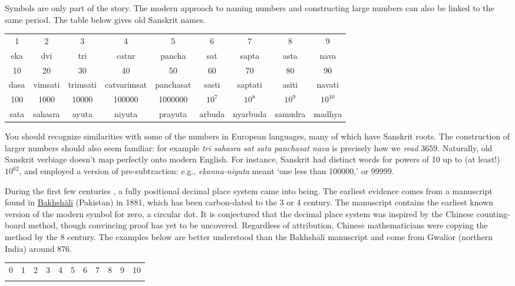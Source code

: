 Symbols are only part of the story. The modern approach to naming numbers and constructing large numbers can also be linked to the same period. The table below gives old Sanskrit names.
\begin{center}
	\begin{tabular}{ccccccccc}
		1&2&3&4&5&6&7&8&9\\
		eka&dvi&tri&catur&pancha&sat&sapta&asta&nava\\[0.3cm]
		10&20&30&40&50&60&70&80&90\\
		dasa&vimsati&trimsati&catvarimsat&panchasat&sasti&saptati&asiti&navati\\[0.3cm]
		100&1000&10000&100000&1000000&$10^7$&$10^8$&$10^9$&$10^{10}$\\
		sata&sahasra&ayuta&niyuta&prayuta&arbuda&nyarbuda&samudra&madhya
	\end{tabular}
\end{center}
You should recognize similarities with some of the numbers in European languages, many of which have Sanskrit roots. The construction of larger numbers should also seem familiar: for example \emph{tri sahasra sat sata panchasat nava} is precisely how we \emph{read} 3659.
\smallbreak
Naturally, old Sanskrit verbiage doesn't map perfectly onto modern English. For instance, Sanskrit had distinct words for powers of 10 up to (at least!) $10^{62}$, and employed a version of pre-subtraction: e.g., \emph{ekanna-niyuta} meant `one less than 100000,' or 99999.



During the first few centuries \AD{}, a fully positional decimal place system came into being. The earliest evidence comes from a manuscript found in \href{http://www.bbc.com/news/uk-england-oxfordshire-41265057}{Bakhshālī} (Pakistan) in 1881, which has been carbon-dated to the 3\rd{} or 4\th{} century. The manuscript contains the earliest known version of the modern symbol for zero, a circular dot. It is conjectured that the decimal place system was inspired by the Chinese counting-board method, though convincing proof has yet to be uncovered. Regardless of attribution, Chinese mathematicians were copying the method by the 8\th{} century.\smallbreak
The examples below are better understood than the Bakhshālī manuscript and come from Gwalior (northern India) around 876.
\begin{center}
	\begin{tabular}{ccccccccccc}
		0&1&2&3&4&5&6&7&8&9&10\\
		\IndiaGzero&\IndiaGone&\IndiaGtwo&\IndiaGthree&\IndiaGfour&\IndiaGfive&\IndiaGsix&\IndiaGseven&\IndiaGeight&\IndiaGnine&\IndiaGten
	\end{tabular}
\end{center}

